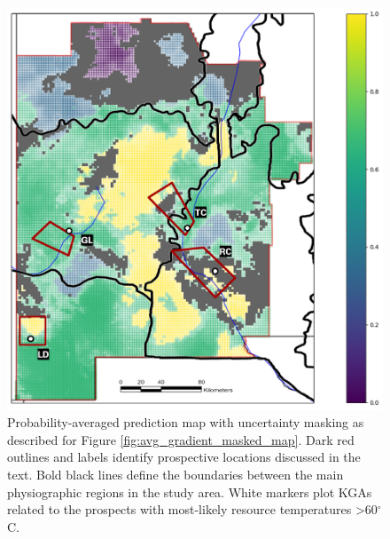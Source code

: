 \begin{figure}
\centering
\includegraphics[width=.75\textwidth]{templates/images/Figure-Masked_Average_Gradient_Map-Prospect_Zones.png}
\caption[Structural uncertainty map with prospective areas]
{Probability-averaged prediction map with uncertainty masking as described for Figure \ref{fig:avg_gradient_masked_map}. Dark red outlines and labels identify prospective locations discussed in the text. Bold black lines define the boundaries between the main physiographic regions in the study area. White markers plot KGAs related to the prospects with most-likely resource temperatures >60$^\circ$C.}
\label{fig:structural_uncertainty_prospects}
\end{figure}

